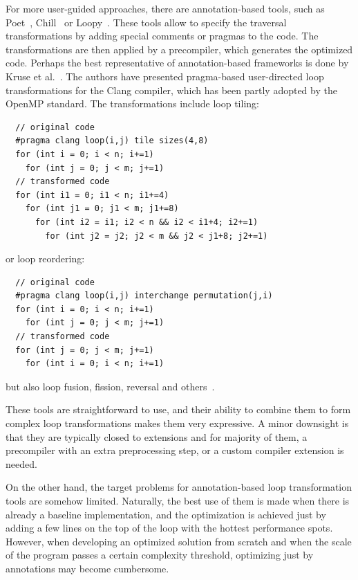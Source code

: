 For more user-guided approaches, there are annotation-based tools, such as Poet~\cite{yi2007poet}, Chill~\cite{chen2008chill} or Loopy~\cite{namjoshi2016loopy}. These tools allow to specify the traversal transformations by adding special comments or pragmas to the code. The transformations are then applied by a precompiler, which generates the optimized code. Perhaps the best representative of annotation-based frameworks is done by Kruse et al.~\cite{kruse2018user}. The authors have presented pragma-based user-directed loop transformations for the Clang compiler, which has been partly adopted by the OpenMP standard. The transformations include loop tiling:
\begin{verbatim}
  // original code
  #pragma clang loop(i,j) tile sizes(4,8)
  for (int i = 0; i < n; i+=1)
    for (int j = 0; j < m; j+=1)
  // transformed code
  for (int i1 = 0; i1 < n; i1+=4)
    for (int j1 = 0; j1 < m; j1+=8)
      for (int i2 = i1; i2 < n && i2 < i1+4; i2+=1)
        for (int j2 = j2; j2 < m && j2 < j1+8; j2+=1)
\end{verbatim}
or loop reordering:
\begin{verbatim}
  // original code
  #pragma clang loop(i,j) interchange permutation(j,i)
  for (int i = 0; i < n; i+=1)
    for (int j = 0; j < m; j+=1)
  // transformed code
  for (int j = 0; j < m; j+=1)
    for (int i = 0; i < n; i+=1)
\end{verbatim}
but also loop fusion, fission, reversal and others~\cite{mckinley1996improving}. 

These tools are straightforward to use, and their ability to combine them to form complex loop transformations makes them very expressive. A minor downsight is that they are typically closed to extensions and for majority of them, a precompiler with an extra preprocessing step, or a custom compiler extension is needed.

On the other hand, the target problems for annotation-based loop transformation tools are somehow limited. Naturally, the best use of them is made when there is already a baseline implementation, and the optimization is achieved just by adding a few lines on the top of the loop with the hottest performance spots. However, when developing an optimized solution from scratch and when the scale of the program passes a certain complexity threshold, optimizing just by annotations may become cumbersome. 

